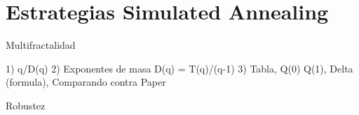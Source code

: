\section{Estrategias Simulated Annealing}



Multifractalidad

1) q/D(q)
2) Exponentes de masa D(q) = T(q)/(q-1)
3) Tabla, Q(0) Q(1), Delta (formula), Comparando contra Paper

Robustez
